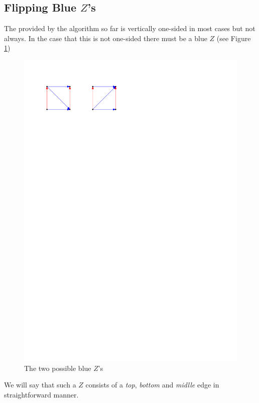 
\subsection{Flipping Blue $Z$'s}
\thispagestyle{plain}
\label{ss:flipBlueZ}

  The \rel provided by the algorithm so far is vertically one-sided in most cases but not always. In the case that this \rel is not one-sided there must be a blue $Z$ (see Figure \ref{fig:zflip:blueZ})

  \begin{figure}[h]
    \centering
    \includegraphics[scale=1]{unifiedAlgo/img/zflip/blueZ.pdf}
    \caption{The two possible blue $Z$'s}
    \label{fig:zflip:blueZ}
  \end{figure}

  We will say that such a $Z$ consists of a \emph{top}, \emph{bottom} and \emph{midlle} edge in straightforward manner. 


